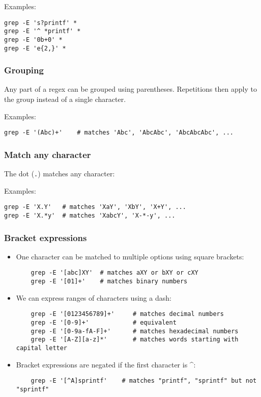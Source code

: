 \documentclass[12pt]{article}
\begin{document}
\noindent Examples:

\begin{verbatim}
grep -E 's?printf' *
grep -E '^ *printf' *
grep -E '0b+0' *
grep -E 'e{2,}' *
\end{verbatim}

\subsubsection{Grouping}

Any part of a regex can be grouped using parentheses.
Repetitions then apply to the group instead of a single character.

\noindent Examples:

\begin{verbatim}
grep -E '(Abc)+'    # matches 'Abc', 'AbcAbc', 'AbcAbcAbc', ...
\end{verbatim}

\subsubsection{Match any character}

The dot (\texttt{.}) matches any character:

\noindent Examples:

\begin{verbatim}
grep -E 'X.Y'   # matches 'XaY', 'XbY', 'X+Y', ...
grep -E 'X.*y'  # matches 'XabcY', 'X-*-y', ...
\end{verbatim}

\subsubsection{Bracket expressions}

\begin{itemize}
    \item One character can be matched to multiple options using square brackets:
    \begin{verbatim}
    grep -E '[abc]XY'  # matches aXY or bXY or cXY
    grep -E '[01]+'    # matches binary numbers
    \end{verbatim}

    \item We can express ranges of characters using a dash:
    \begin{verbatim}
    grep -E '[0123456789]+'     # matches decimal numbers
    grep -E '[0-9]+'            # equivalent
    grep -E '[0-9a-fA-F]+'      # matches hexadecimal numbers
    grep -E '[A-Z][a-z]*'       # matches words starting with capital letter
    \end{verbatim}

    \item Bracket expressions are negated if the first character is \textasciicircum:
    \begin{verbatim}
    grep -E '[^A]sprintf'    # matches "printf", "sprintf" but not "sprintf"
    \end{verbatim}
\end{itemize}
\end{document}
